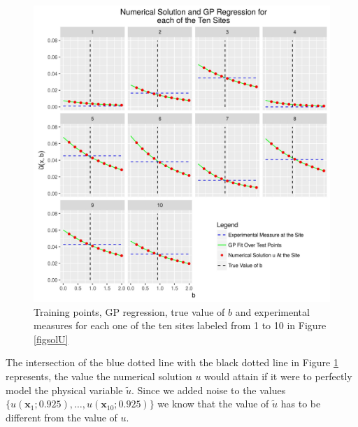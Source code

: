 \documentclass[12pt]{book}
\newcommand{\x}{\textbf{x}}
\begin{document}
%
%

\begin{figure}[H]
\centering
\includegraphics[scale=0.7]{./FigChap3/fitted}
\caption{Training points, GP regression, true value of $b$ and experimental measures for each one of the ten sites labeled
from 1 to 10 in Figure \ref{figsolU}}
\label{fignofitted}
\end{figure}

The intersection of the blue dotted line with the black dotted line in Figure \ref{fignofitted} represents, 
the value the numerical 
solution $u$  would attain  if it were to  perfectly model the physical variable $\tilde{u}$. 
Since we added noise to the values
$\{u(\x_{1};0.925),\ldots,u(\x_{10};0.925)\}$ we know that the value of $\tilde{u}$ has to be different 
from the value of $u$.
\newline
\end{document}
